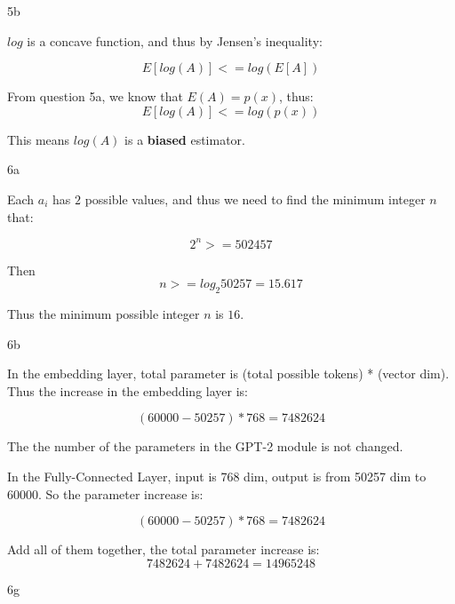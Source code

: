 \LARGE
5b
\normalsize

\begin{answer}
    \(log\) is a concave function, and thus by Jensen's inequality:

    \begin{equation}
        E[log(A)] <= log(E[A])
    \end{equation}

    From question 5a, we know that \(E(A)=p(x)\), thus:
    \begin{equation}
        E[log(A)] <= log(p(x))
    \end{equation}

    This means \(log(A)\) is a \textbf{biased} estimator.
\end{answer}

\clearpage

\LARGE
6a
\normalsize

\begin{answer}
    Each \(a_i\) has \(2\) possible values, and thus we need to find the minimum integer \(n\) that:

    \begin{equation}
        2^n >= 502457
    \end{equation}

    Then
    \begin{equation}
        n >= log_2 50257 = 15.617
    \end{equation}

    Thus the minimum possible integer \(n\) is \(16\).
\end{answer}

\LARGE
6b
\normalsize

\begin{answer}
    In the embedding layer, total parameter is (total possible tokens) * (vector dim). Thus the increase in the embedding layer is:

    \begin{equation}
        (60000-50257)*768=7482624
    \end{equation}

    The the number of the parameters in the GPT-2 module is not changed.

    In the Fully-Connected Layer, input is 768 dim, output is from 50257 dim to 60000. So the parameter increase is:

    \begin{equation}
        (60000-50257)*768=7482624
    \end{equation}

    Add all of them together, the total parameter increase is:
    \begin{equation}
        7482624 + 7482624 = 14965248
    \end{equation}
\end{answer}

\LARGE
6g
\normalsize

\begin{answer}
\end{answer}


